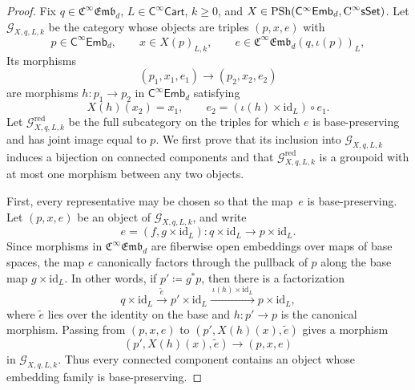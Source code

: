 \documentclass{amsart}
\newcommand{\cat}[1]{\mathsf{#1}}
\newcommand{\sset}{\cat{sSet}}
\newcommand{\id}{\mathrm{id}}
\newcommand{\CsSet}{\textnormal{C}^{\infty}\sset}
\newcommand{\Cart}{\cat{C}^{\infty}\cat{Cart}}
\newcommand{\fembnoniso}[1]{\cat{C}^{\infty}\cat{Emb}_{#1}}
\newcommand{\femb}[1]{\mathfrak{C}^{\infty}\mathfrak{Emb}_{#1}}
\newcommand{\psh}{\mathrm{PSh}}
\theoremstyle{definition}
\numberwithin{equation}{subsection}
\numberwithin{subsubsection}{subsection}
\begin{document}
\begin{proof}
  Fix \(q\in \femb{d}\), \(L\in \Cart\), \(k\geq 0\), and
  \(X\in \psh(\fembnoniso{d},\CsSet)\). Let
  \(\mathcal{G}_{X,q,L,k}\) be the category whose objects are triples
  \((p,x,e)\) with
  \[
    p\in \fembnoniso{d},\qquad
    x\in X(p)_{L,k},\qquad
    e\in \femb{d}(q,\iota(p))_L,
  \]
  Its morphisms
  \[
    (p_1,x_1,e_1)\longrightarrow (p_2,x_2,e_2)
  \]
  are morphisms \(h:p_1\to p_2\) in \(\fembnoniso{d}\) satisfying
  \[
    X(h)(x_2)=x_1,
    \qquad
    e_2=(\iota(h)\times \id_L)\circ e_1.
  \]
  Let \(\mathcal{G}^{\mathrm{red}}_{X,q,L,k}\) be the full subcategory on
  the triples for which \(e\) is base-preserving and has joint image equal
  to \(p\). We first prove that its inclusion into
  \(\mathcal{G}_{X,q,L,k}\) induces a bijection on connected components and
  that \(\mathcal{G}^{\mathrm{red}}_{X,q,L,k}\) is a groupoid with at most
  one morphism between any two objects.

  First, every representative may be chosen so that the map~\(e\) is
  base-preserving. Let \((p,x,e)\) be an object of
  \(\mathcal{G}_{X,q,L,k}\), and write
  \[
    e=(f,g\times \id_L):q\times \id_L\longrightarrow p\times \id_L.
  \]
  Since morphisms in \(\femb{d}\) are fiberwise open embeddings over maps of
  base spaces, the map \(e\) canonically factors through the pullback of \(p\)
  along the base map \(g\times \id_L\). In other words, if
  \(p'\coloneqq g^{*}p\), then there is a factorization
  \[
    q\times \id_L
    \xrightarrow{\ \widetilde{e}\ }
    p'\times \id_L
    \xrightarrow{\ \iota(h)\times \id_L\ }
    p\times \id_L,
  \]
  where \(\widetilde{e}\) lies over the identity on the base and
  \(h:p'\to p\) is the canonical morphism. Passing from \((p,x,e)\) to
  \((p',X(h)(x),\widetilde{e})\) gives a morphism
  \[
    (p',X(h)(x),\widetilde{e})\longrightarrow (p,x,e)
  \]
  in \(\mathcal{G}_{X,q,L,k}\). Thus every connected component contains an
  object whose embedding family is base-preserving.


\end{proof}
\end{document}

